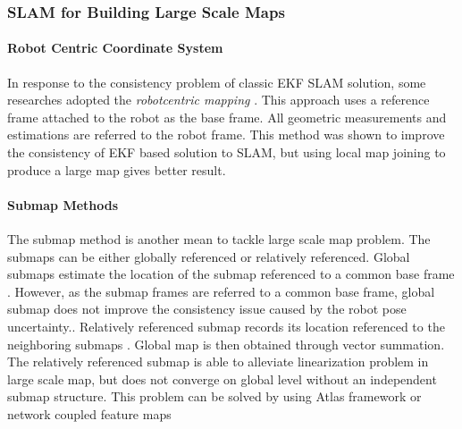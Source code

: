 \subsubsection{SLAM for Building Large Scale Maps}
\paragraph{Robot Centric Coordinate System}In response to the
consistency problem of classic EKF SLAM solution, some researches
adopted the \emph{robotcentric mapping} \cite{castellanos_limits_2004}
\cite{civera_1-point_2009}. This approach uses a reference frame
attached to the robot as the base frame. All geometric measurements
and estimations are referred to the robot frame. This method was shown
to improve the consistency of EKF based solution to SLAM, but using
local map joining to produce a large map gives better result.

\paragraph{Submap Methods}The submap method is another mean to
tackle large scale map problem. The submaps can be either globally
referenced or relatively referenced. Global submaps estimate the
location of the submap referenced to a common base frame
\cite{estrada_hierarchical_2005} \cite{leonard_consistent_2003}.
However, as the submap frames are referred to a common base frame,
global submap does not improve the consistency issue caused by the
robot pose uncertainty.\cite{bailey_simultaneous_2006}. Relatively
referenced submap records its location referenced to the neighboring
submaps \cite{chong_feature-based_1999}
\cite{williams_efficient_2001}. Global map is then obtained through
vector summation. The relatively referenced submap is able to alleviate
linearization problem in large scale map, but does not converge on
global level without an independent submap structure. This problem can
be solved by using Atlas framework or network coupled feature maps
\cite{bosse_slam_2004} \cite{bailey_mobile_2002}

